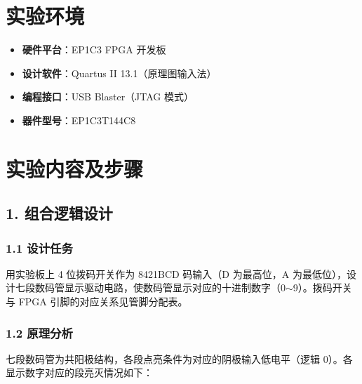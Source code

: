 \documentclass[12pt, a4paper]{article}
\begin{document}
\section*{实验环境}

\begin{itemize}
\item \textbf{硬件平台}：EP1C3 FPGA 开发板
\item \textbf{设计软件}：Quartus II 13.1（原理图输入法）
\item \textbf{编程接口}：USB Blaster（JTAG 模式）
\item \textbf{器件型号}：EP1C3T144C8
\end{itemize}

\section*{实验内容及步骤}

\subsection{1. 组合逻辑设计}

\subsubsection{1.1 设计任务}

用实验板上 4 位拨码开关作为 8421BCD 码输入（D 为最高位，A 为最低位），设计七段数码管显示驱动电路，使数码管显示对应的十进制数字（0$\sim$9）。拨码开关与 FPGA 引脚的对应关系见管脚分配表。

\subsubsection{1.2 原理分析}

七段数码管为共阳极结构，各段点亮条件为对应的阴极输入低电平（逻辑 0）。各显示数字对应的段亮灭情况如下：
\end{document}
